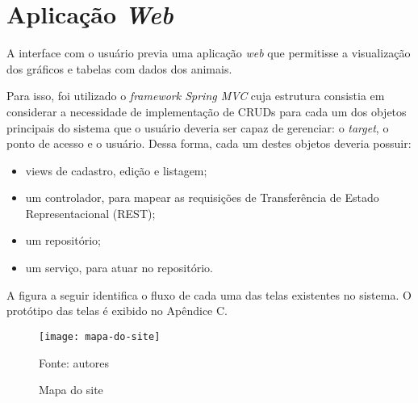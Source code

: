 \section{Aplicação \emph{Web}}

A interface com o usuário previa uma aplicação \emph{web} que permitisse a visualização dos gráficos e tabelas com dados dos animais.

Para isso, foi utilizado o \emph{framework Spring MVC} cuja estrutura consistia em considerar a necessidade de implementação de CRUDs para cada um dos objetos principais do sistema que o usuário deveria ser capaz de gerenciar: o \emph{target}, o ponto de acesso e o usuário. Dessa forma, cada um destes objetos deveria possuir:

\begin{itemize}
	\item views de cadastro, edição e listagem;
	\item um controlador, para mapear as requisições de Transferência de Estado Representacional (REST);
	\item um repositório;
	\item um serviço, para atuar no repositório.
\end{itemize}

A figura a seguir identifica o fluxo de cada uma das telas existentes no sistema. O protótipo das telas é exibido no Apêndice C.

\begin{figure}[ht]
  \centering
    \caption{Mapa do site}
    \texttt{[image: mapa-do-site]}
  \centerline{\small{Fonte: autores}}
\end{figure}
\FloatBarrier
